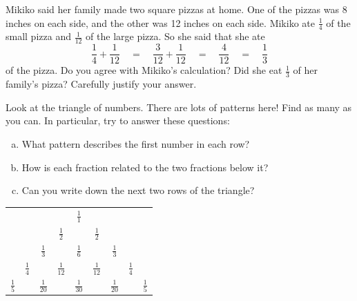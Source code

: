 \begin{problem}
Mikiko said her family made two square pizzas at home.  One of the pizzas was 8 inches on each side, and the other was 12 inches on each side.  Mikiko ate $\frac 1 4$ of the small pizza and $\frac 1{12}$ of the large pizza.  So she said  that she ate 
\[
\frac 1 4 + \frac 1 {12} 
\quad 
= 
\quad 
\frac 3{12} + \frac 1 {12} 
\quad 
= 
\quad 
\frac 4{12} 
\quad 
= 
\quad 
\frac 1 3
\]
of the pizza.
Do you agree with Mikiko's calculation?  Did she eat $\frac 1 3$ of her family's pizza?  Carefully justify your answer.
\end{problem}


\begin{problem}
Look at the triangle of numbers.  There are lots of patterns here!  Find as many as you can.  In particular, try to answer these questions:

\begin{enumerate}[(a)]
\item
What  pattern describes the first number in each row?
\item
How is each fraction related to the two fractions below it?
\item
Can you write down the next two rows of the triangle? 
\end{enumerate}

\begin{center}
\begin{tabular}{ccccccccc}
&&&& $\displaystyle\frac 1 1$ & & & &\\
&&&$\displaystyle\frac 1 2$&  &$\displaystyle\frac 1 2$ & & &\\
&&$\displaystyle\frac 1 3$&&$\displaystyle\frac 1 6$  & &$\displaystyle\frac 1 3$ & &\\
&$\displaystyle\frac 1 4$&&$\displaystyle\frac 1 {12}$ & & $\displaystyle\frac 1 {12}$& &$\displaystyle\frac 1 4$ &\\
$\displaystyle\frac 1 5$&&$\displaystyle\frac 1 {20}$&&$\displaystyle\frac 1 {30}$  & &$\displaystyle\frac 1 {20}$ & &$\displaystyle\frac 1 5$\\
\end{tabular}
\end{center}

\end{problem}



